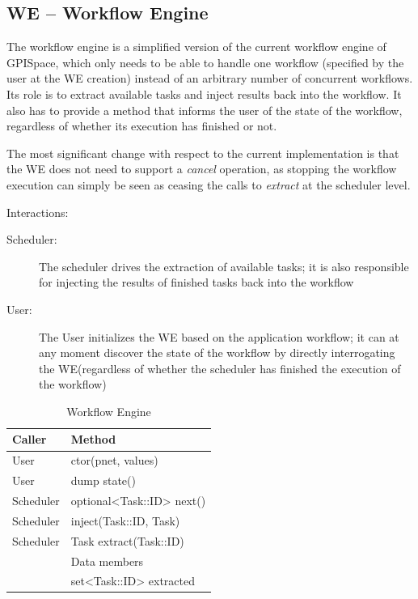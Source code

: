 \documentclass[10pt]{article}
\newcommand{\user}{User\xspace}
\newcommand{\sched}{Scheduler\xspace}
\newcommand{\we}{WE\xspace}
\newcommand{\task}{Task\xspace}
\newcommand{\id}{::ID\xspace}
\begin{document}
\subsection{WE -- Workflow Engine}
\label{sec:we}
The workflow engine is a simplified version of the current workflow engine of
GPISpace, which only needs to be able to handle one workflow (specified by the
user at the \we creation) instead of an arbitrary number of concurrent
workflows. 
Its role is to extract available tasks and inject results back into the
workflow. It also has to provide a method that informs the user of the state of
the workflow, regardless of whether its execution has finished or not.

The most significant change with respect to the current implementation is that
the \we does not need to support a \emph{cancel} operation, as stopping the
workflow execution can simply be seen as ceasing the calls to  \emph{extract} at
the scheduler level. 

Interactions:
\begin{description}
    \item [\sched:] The scheduler drives the extraction of available tasks; it
    is also responsible for injecting the results of finished tasks back into the
    workflow
    \item [\user:] The \user initializes the \we based on the application
    workflow; it can at any moment discover the state of the workflow by directly
    interrogating the \we (regardless of whether the scheduler has finished the
    execution of the workflow)
\end{description}
%
\begin{table}[ht]
    \centering
    \caption{Workflow Engine}
    \label{tab:we}
    \bgroup
    \setlength{\tabcolsep}{2em}
    \begin{tabular}{ll}
        \toprule
        Caller & Method \\
        \midrule
        \user & ctor(pnet, values) \\
        \user & dump state() \\
        \sched & optional<\task\id> next()  \\
        \sched & inject(\task\id, \task) \\
        \sched & \task extract(\task\id) \\
        \midrule
        & Data members \\
        \midrule
        & set<\task\id> extracted \\
        \bottomrule
    \end{tabular}
    \egroup
\end{table}
%
\end{document}
